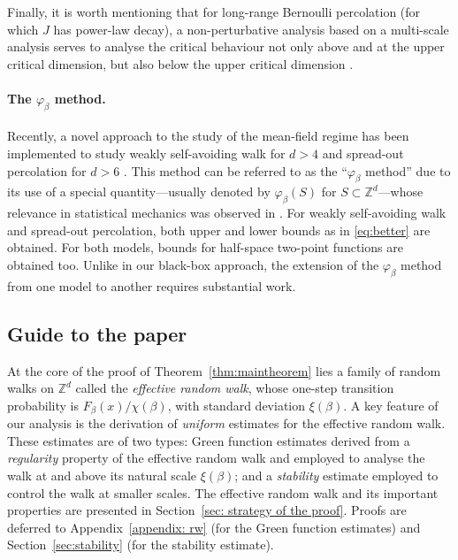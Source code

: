 \documentclass[11pt,a4paper]{article}
\numberwithin{equation}{section}
\theoremstyle{plain}
\theoremstyle{definition}
\newcommand\1{\mathds{1}}
\begin{document}
 Finally, it is worth mentioning that for long-range Bernoulli percolation
 (for which $J$ has power-law decay),
 a non-perturbative analysis based on a multi-scale analysis serves
 to analyse the critical behaviour not only above and at the upper critical dimension,
 but also below the upper critical dimension \cite{Hutc26I,Hutc26II,Hutc26III}.


 \paragraph{The $\varphi_\beta$ method.}
 Recently, a novel approach to the study of the mean-field regime has been implemented to study weakly self-avoiding
walk for $d>4$ and spread-out percolation for $d>6$ \cite{DP25a,DP25b}. This method can be referred to as the ``$\varphi_\beta$ method'' due to its use of a special
quantity---usually denoted by $\varphi_\beta(S)$ for $S\subset \mathbb Z^d$---whose relevance in statistical mechanics was observed in \cite{Simo80,DT16}.
For weakly self-avoiding walk and spread-out percolation, both upper
and lower bounds as in \eqref{eq:better} are obtained.
For both models, bounds for half-space
two-point functions are obtained too.
Unlike in our black-box approach, the extension of the
$\varphi_\beta$ method from one model to another requires substantial work.

\subsection{Guide to the paper}
\label{sec:guide}


At the core of the proof of Theorem~\ref{thm:maintheorem} lies a family of random walks on $\mathbb Z^d$ called the \emph{effective random walk}, whose one-step transition
probability is $F_\beta(x)/\chi(\beta)$, with standard deviation $\xi(\beta)$.
A key feature of our analysis is the derivation of \emph{uniform} estimates for the effective random walk. These estimates are of two types: Green function estimates
derived from a \emph{regularity} property of the effective random walk and
employed to analyse the walk at and above its natural scale $\xi(\beta)$; and a \emph{stability} estimate employed to control the walk at smaller scales.
The effective random walk and its important properties are presented in Section~\ref{sec: strategy of the proof}. Proofs are deferred to Appendix~\ref{appendix: rw} (for the Green function estimates) and Section~\ref{sec:stability} (for the stability estimate).
\end{document}
